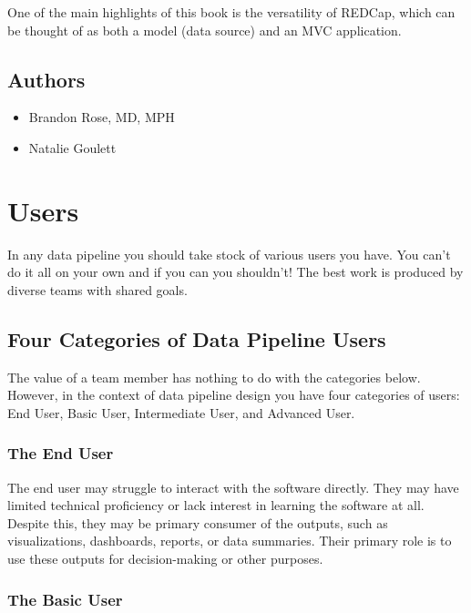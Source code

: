 \documentclass[
]{book}
\providecommand{\tightlist}{%
  \setlength{\itemsep}{0pt}\setlength{\parskip}{0pt}}
\begin{document}
One of the main highlights of this book is the versatility of REDCap, which can be thought of as both a model (data source) and an MVC application.

\section{Authors}\label{authors}

\begin{itemize}
\tightlist
\item
  Brandon Rose, MD, MPH
\item
  Natalie Goulett
\end{itemize}

\chapter{Users}\label{users}

In any data pipeline you should take stock of various users you have. You can't do it all on your own and if you can you shouldn't! The best work is produced by diverse teams with shared goals.

\section{Four Categories of Data Pipeline Users}\label{four-categories-of-data-pipeline-users}

The value of a team member has nothing to do with the categories below. However, in the context of data pipeline design you have four categories of users: End User, Basic User, Intermediate User, and Advanced User.

\subsection*{The End User}\label{the-end-user}

The end user may struggle to interact with the software directly. They may have limited technical proficiency or lack interest in learning the software at all. Despite this, they may be primary consumer of the outputs, such as visualizations, dashboards, reports, or data summaries. Their primary role is to use these outputs for decision-making or other purposes.

\subsection*{The Basic User}\label{the-basic-user}
\end{document}
